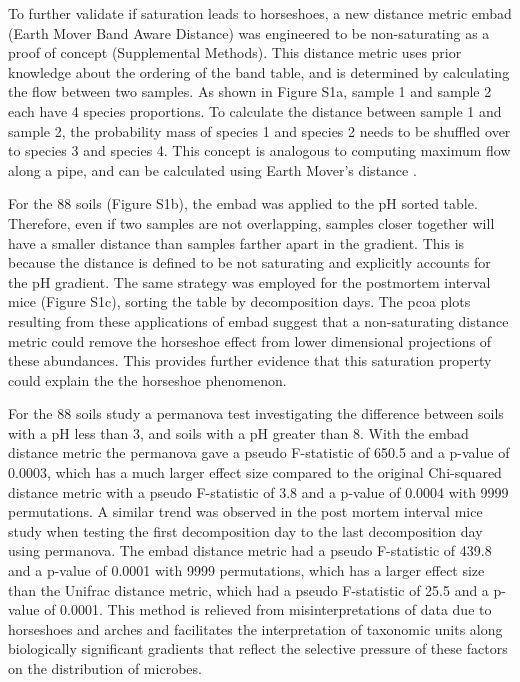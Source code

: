 To further validate if saturation leads to horseshoes, a new distance metric \gls{embad} (Earth Mover Band Aware Distance) was engineered to be non-saturating as a proof of concept (Supplemental Methods).  This distance metric uses prior knowledge about the ordering of the band table, and is determined by calculating the flow between two samples. As shown in Figure S1a, sample 1 and sample 2 each have 4 species proportions.  To calculate the distance between sample 1 and sample 2, the probability mass of species 1 and species 2 needs to be shuffled over to species 3 and species 4.  This concept is analogous to computing maximum flow along a pipe, and can be calculated using Earth Mover's distance \cite{emd, unifrac_emd, unifrac}.\par
For the 88 soils (Figure S1b), the \gls{embad} was applied to the pH sorted table. Therefore, even if two samples are not overlapping, samples closer together will have a smaller distance than samples farther apart in the gradient.  This is because the distance is defined to be not saturating and explicitly accounts for the pH gradient.  The same strategy was employed for the postmortem interval mice (Figure S1c), sorting the table by decomposition days. The \gls{pcoa} plots resulting from these applications of \gls{embad} suggest that a non-saturating distance metric could remove the horseshoe effect from lower dimensional projections of these abundances.  This provides further evidence that this saturation property could explain the the horseshoe phenomenon.\par
For the 88 soils study a \gls{permanova} test investigating the difference between soils with a pH less than 3, and soils with a pH greater than 8.  With the \gls{embad} distance metric the \gls{permanova} gave a pseudo F-statistic of 650.5 and a p-value of 0.0003, which has a much larger effect size compared to the original Chi-squared distance metric with a pseudo F-statistic of 3.8 and a p-value of 0.0004 with 9999 permutations.  A similar trend was observed in the post mortem interval mice study when testing the first decomposition day to the last decomposition day using \gls{permanova}.  The \gls{embad} distance metric had a pseudo F-statistic of 439.8 and a p-value of 0.0001 with 9999 permutations, which has a larger effect size than the Unifrac distance metric, which had a pseudo F-statistic of 25.5 and a p-value of 0.0001. This method is relieved from misinterpretations of data due to horseshoes and arches and facilitates the interpretation of taxonomic units along biologically significant gradients that reflect the selective pressure of these factors on the distribution of microbes.  \par
